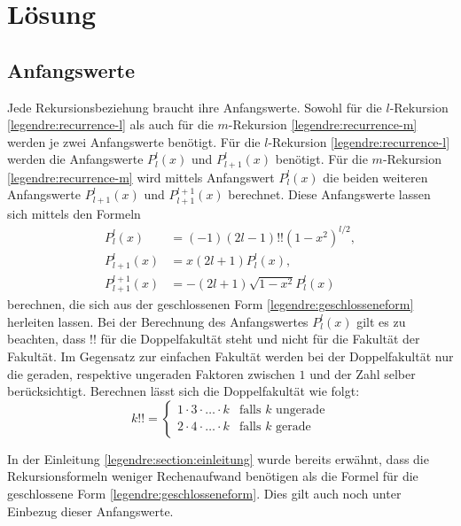 %
%
%
\section{Lösung
\label{legendre:section:loesung}}
\subsection{Anfangswerte
\label{legendre:subsection:anfangswerte}}
Jede Rekursionsbeziehung braucht ihre Anfangswerte.
Sowohl für die $l$-Rekursion \eqref{legendre:recurrence-l} als auch für die $m$-Rekursion \eqref{legendre:recurrence-m} werden je zwei Anfangswerte benötigt.
Für die $l$-Rekursion \eqref{legendre:recurrence-l} werden die Anfangswerte $P^{l}_{l}(x)$ und $P^{l}_{l+1}(x)$ benötigt.
Für die $m$-Rekursion \eqref{legendre:recurrence-m} wird mittels Anfangswert $P^{l}_{l}(x)$ die beiden weiteren Anfangswerte $P^{l}_{l+1}(x)$ und $P^{l+1}_{l+1}(x)$ berechnet.
Diese Anfangswerte lassen sich mittels den Formeln
\begin{equation}
\begin{aligned}
P^{l}_{l}(x)
&=(-1)(2l-1)!!(1-x^2)^{l/2},\\
P^{l}_{l+1}(x)
&=x(2l+1)P^{l}_{l}(x),\\
P^{l+1}_{l+1}(x)
&=-(2l+1)\sqrt{1-x^2}P^{l}_{l}(x)
\label{legendre:anfangswerte}
\end{aligned}
\end{equation}
berechnen, die sich aus der geschlossenen Form \eqref{legendre:geschlosseneform} herleiten lassen.
Bei der Berechnung des Anfangswertes $P^{l}_{l}(x)$ gilt es zu beachten, dass $!!$ für die Doppelfakultät steht und nicht für die Fakultät der Fakultät.
Im Gegensatz zur einfachen Fakultät werden bei der Doppelfakultät nur die geraden, respektive ungeraden Faktoren zwischen $1$ und der Zahl selber berücksichtigt.
Berechnen lässt sich die Doppelfakultät wie folgt:
\begin{equation}
k!! = 
\begin{cases}
1 \cdot 3 \cdot \ldots \cdot k & \text{falls $k$ ungerade}\\
2 \cdot 4 \cdot \ldots \cdot k & \text{falls $k$ gerade}
\end{cases}
\label{legendre:doppelfakultaet}
\end{equation}

In der Einleitung \ref{legendre:section:einleitung} wurde bereits erwähnt, dass die Rekursionsformeln weniger Rechenaufwand benötigen als die Formel für die geschlossene Form \eqref{legendre:geschlosseneform}.
Dies gilt auch noch unter Einbezug dieser Anfangswerte.

